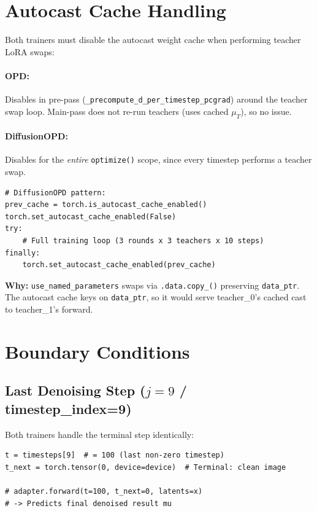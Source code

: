 \documentclass[11pt]{article}
\begin{document}
\section{Autocast Cache Handling}

Both trainers must disable the autocast weight cache when performing teacher LoRA swaps:

\paragraph{OPD:} Disables in pre-pass (\texttt{\_precompute\_d\_per\_timestep\_pcgrad}) around the teacher swap loop. Main-pass does not re-run teachers (uses cached $\mu_T$), so no issue.

\paragraph{DiffusionOPD:} Disables for the \emph{entire} \texttt{optimize()} scope, since every timestep performs a teacher swap.

\begin{lstlisting}
# DiffusionOPD pattern:
prev_cache = torch.is_autocast_cache_enabled()
torch.set_autocast_cache_enabled(False)
try:
    # Full training loop (3 rounds x 3 teachers x 10 steps)
finally:
    torch.set_autocast_cache_enabled(prev_cache)
\end{lstlisting}

\textbf{Why:} \texttt{use\_named\_parameters} swaps via \texttt{.data.copy\_()} preserving \texttt{data\_ptr}. The autocast cache keys on \texttt{data\_ptr}, so it would serve teacher\_0's cached cast to teacher\_1's forward.

\section{Boundary Conditions}

\subsection{Last Denoising Step ($j=9$ / timestep\_index=9)}

Both trainers handle the terminal step identically:
\begin{lstlisting}
t = timesteps[9]  # = 100 (last non-zero timestep)
t_next = torch.tensor(0, device=device)  # Terminal: clean image

# adapter.forward(t=100, t_next=0, latents=x)
# -> Predicts final denoised result mu
\end{lstlisting}
\end{document}
